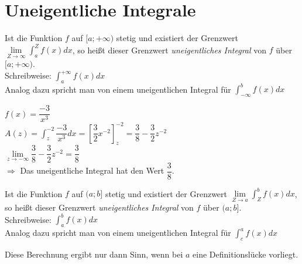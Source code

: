 \section{Uneigentliche Integrale}
\begin{Definition}
  Ist die Funktion $f$ auf $[a;+\infty)$ stetig und existiert der Grenzwert \( \displaystyle\lim\limits_{Z \rightarrow \infty} \int_a^Z f(x)dx\),
  so heißt dieser Grenzwert \emph{uneigentliches Integral} von $f$ über $[a;+\infty)$.\\
  Schreibweise: \( \displaystyle\int_a^{+\infty} f(x)dx\)\\
  Analog dazu spricht man von einem uneigentlichen Integral für \( \displaystyle\int_{-\infty}^b f(x)dx\)
\end{Definition}
\begin{Beispiel}
  $f(x)=\dfrac{-3}{x^3}$\\
  \( \displaystyle A(z)=\int_z^{-2} \dfrac{-3}{x^3} dx = \left[\dfrac{3}{2}x^{-2}\right]_z^{-2} = \dfrac{3}{8}-\dfrac{3}{2}z^{-2}\)\\
  $\lim \limits_{z \rightarrow -\infty} \dfrac{3}{8}-\dfrac{3}{2}z^{-2} = \dfrac{3}{8}$\\
  $\Rightarrow$ Das uneigentliche Integral hat den Wert $\dfrac{3}{8}$.
\end{Beispiel}
\begin{Definition}
  Ist die Funktion $f$ auf $(a;b]$ stetig und existiert der Grenzwert \( \displaystyle\lim\limits_{Z \rightarrow a} \int_Z^b f(x)dx\),
  so heißt dieser Grenzwert \emph{uneigentliches Integral} von $f$ über $(a;b]$.\\
  Schreibweise: \( \displaystyle\int_a^b f(x)dx\)\\
  Analog dazu spricht man von einem uneigentlichen Integral für \( \displaystyle\int_{c}^a f(x)dx\)
\end{Definition}
\begin{Bemerkung}
  Diese Berechnung ergibt nur dann Sinn, wenn bei $a$ eine Definitionslücke vorliegt.
\end{Bemerkung}
